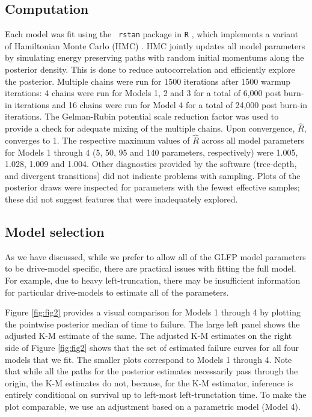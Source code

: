 \documentclass[12pt]{article}
\begin{document}
\subsection{Computation}
\label{sec:Computation}
Each model was fit using the {\tt
  rstan} \citep{rstan} package in {\tt R} \citep{r}, which implements a variant of Hamiltonian Monte Carlo (HMC)
\citep{betancourt}. HMC jointly updates all model parameters by simulating energy preserving paths with random initial momentums along the posterior density. This is done to reduce autocorrelation and efficiently explore the posterior. Multiple chains were run for 1500 iterations after 1500 warmup iterations: 4 chains were run for Models 1, 2 and 3 for a total of 6,000 post burn-in iterations and 16 chains were run for Model 4 for a total of 24,000 post burn-in iterations. The Gelman-Rubin potential scale reduction factor was used to provide a check for adequate mixing of the multiple chains. Upon convergence, $\hat{R}$, converges to 1.  The  respective maximum values of $\hat{R}$ across all model parameters for Models 1 through 4 (5, 50, 95 and 140 parameters, respectively) were 1.005, 1.028, 1.009 and 1.004. Other diagnostics provided by the software (tree-depth, and divergent transitions) did not indicate problems with sampling. Plots of the posterior draws were inspected for parameters with the fewest effective samples; these did not suggest features that were inadequately explored.




\subsection{Model selection}
\label{sec:Model Comparisons}
As we have discussed, while we prefer to allow all of the GLFP model parameters to be drive-model specific, there are practical issues with fitting the full model. For example, due to heavy left-truncation, there may be insufficient information for particular drive-models to estimate all of the parameters. 

Figure \ref{fig:fig2} provides a visual comparison for Models 1 through 4 by plotting the pointwise posterior median of time to failure. The large left panel shows the adjusted K-M estimate of the same. The adjusted K-M estimates on the right side of Figure \ref{fig:fig2} shows that the set of estimated failure curves for all four models that we fit. The smaller plots correspond to Models 1 through 4.  Note that while all the paths for the posterior estimates necessarily pass through the origin, the K-M estimates do not, because, for the K-M estimator, inference is entirely conditional on survival up to left-most left-trunctation time. To make the plot comparable, we use an adjustment based on a parametric model (Model 4).
\end{document}
